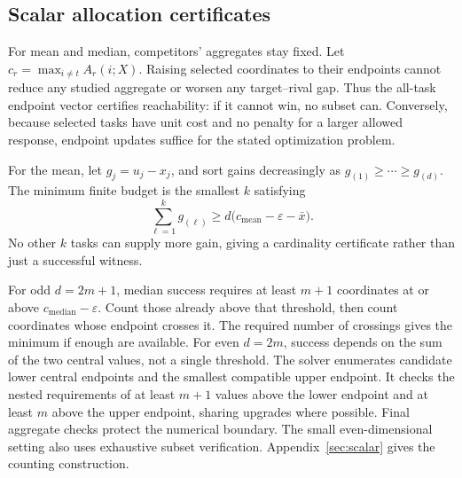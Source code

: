 \documentclass{article}
\newcommand{\tol}{\varepsilon}
\begin{document}
\subsection{Scalar allocation certificates}
For mean and median, competitors' aggregates stay fixed. Let $c_r=\max_{i\ne t}A_r(i;X)$. Raising selected coordinates to their endpoints cannot reduce any studied aggregate or worsen any target--rival gap. Thus the all-task endpoint vector certifies reachability: if it cannot win, no subset can. Conversely, because selected tasks have unit cost and no penalty for a larger allowed response, endpoint updates suffice for the stated optimization problem.

For the mean, let $g_j=u_j-x_j$, and sort gains decreasingly as $g_{(1)}\geq\cdots\geq g_{(d)}$. The minimum finite budget is the smallest $k$ satisfying
\begin{equation}
 \sum_{\ell=1}^{k} g_{(\ell)}\geq d\bigl(c_{\mathrm{mean}}-\tol-\bar{x}\bigr).
 \label{eq:mean}
\end{equation}
No other $k$ tasks can supply more gain, giving a cardinality certificate rather than just a successful witness.

For odd $d=2m+1$, median success requires at least $m+1$ coordinates at or above $c_{\mathrm{median}}-\tol$. Count those already above that threshold, then count coordinates whose endpoint crosses it. The required number of crossings gives the minimum if enough are available. For even $d=2m$, success depends on the sum of the two central values, not a single threshold. The solver enumerates candidate lower central endpoints and the smallest compatible upper endpoint. It checks the nested requirements of at least $m+1$ values above the lower endpoint and at least $m$ above the upper endpoint, sharing upgrades where possible. Final aggregate checks protect the numerical boundary. The small even-dimensional setting also uses exhaustive subset verification. Appendix~\ref{sec:scalar} gives the counting construction.
\end{document}
